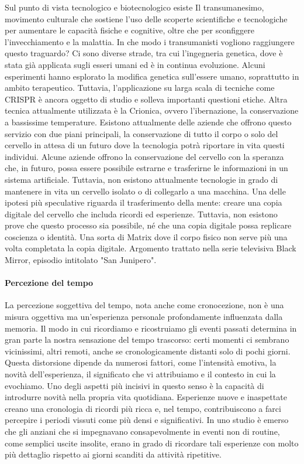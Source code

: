 \documentclass[12pt]{book} %
\begin{document}
Sul punto di vista tecnologico e biotecnologico esiste Il transumanesimo, movimento culturale che sostiene l'uso delle scoperte scientifiche e tecnologiche per aumentare le capacità fisiche e cognitive, oltre che per sconfiggere l'invecchiamento e la
malattia. In che modo i transumanisti vogliono raggiungere questo traguardo? Ci sono diverse strade, tra cui
l'ingegneria genetica, dove è stata già applicata sugli esseri umani ed è in continua evoluzione.
Alcuni esperimenti hanno esplorato la modifica genetica sull’essere umano, soprattutto in ambito terapeutico. Tuttavia, l’applicazione su larga scala di tecniche come CRISPR è ancora oggetto di studio e solleva importanti questioni etiche. Altra tecnica attualmente utilizzata è la
Crionica, ovvero l'ibernazione, la conservazione a bassissime temperature. Esistono attualmente
delle aziende che offrono questo servizio con due piani principali, la conservazione di tutto il corpo o solo del
cervello in attesa di un futuro dove la tecnologia potrà riportare in vita questi individui. Alcune aziende offrono la conservazione del cervello con la speranza che, in futuro, possa essere possibile estrarne e trasferirne le informazioni in un sistema artificiale. Tuttavia, non esistono attualmente tecnologie in grado di mantenere in vita un cervello isolato o di collegarlo a una macchina. Una delle ipotesi più speculative riguarda il trasferimento della mente: creare una copia digitale del cervello che includa ricordi ed esperienze. Tuttavia, non esistono prove che questo processo sia possibile, né che una copia digitale possa replicare coscienza o identità. Una sorta di Matrix dove il corpo fisico non serve più una
volta completata la copia digitale. Argomento trattato nella serie televisiva Black Mirror, episodio intitolato "San Junipero".

\paragraph{Percezione del tempo}

La percezione soggettiva del tempo, nota anche come cronocezione, non è una misura oggettiva ma un’esperienza personale profondamente influenzata dalla memoria. Il modo in cui ricordiamo e ricostruiamo gli eventi passati determina in gran parte la nostra sensazione del tempo trascorso: certi momenti ci sembrano vicinissimi, altri remoti, anche se cronologicamente distanti solo di pochi giorni. Questa distorsione dipende da numerosi fattori, come l’intensità emotiva, la novità dell’esperienza, il significato che vi attribuiamo e il contesto in cui la evochiamo.
Uno degli aspetti più incisivi in questo senso è la capacità di introdurre novità nella propria vita quotidiana. Esperienze nuove e inaspettate creano una cronologia di ricordi più ricca  e, nel tempo, contribuiscono a farci percepire i periodi vissuti come più densi e significativi. In uno studio è emerso che gli anziani che si impegnavano consapevolmente in eventi non di routine, come semplici uscite insolite, erano in grado di ricordare tali esperienze con molto più dettaglio rispetto ai giorni scanditi da attività ripetitive. 
\end{document}
